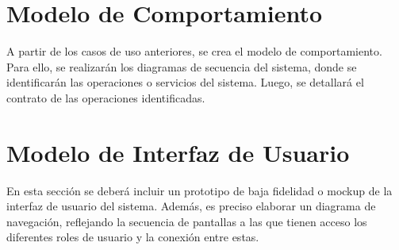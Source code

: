 \section{Modelo de Comportamiento}
A partir de los casos de uso anteriores, se crea el modelo de comportamiento. Para ello, se realizarán los diagramas de secuencia del sistema, donde se identificarán las operaciones o servicios del sistema. Luego, se detallará el contrato de las operaciones identificadas.

\section{Modelo de Interfaz de Usuario}
En esta sección se deberá incluir un prototipo de baja fidelidad o mockup de la interfaz de usuario del sistema. Además, es preciso elaborar un diagrama de navegación, reflejando la secuencia de pantallas a las que tienen acceso los diferentes roles de usuario y la conexión entre estas.
